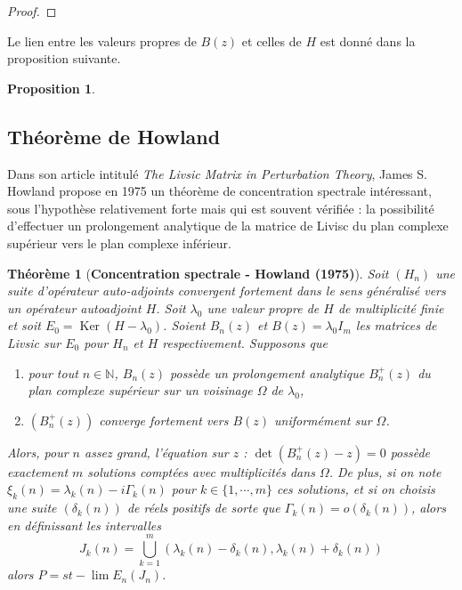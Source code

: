 \documentclass[12pt,openany,a4paper, titlepage]{article}
\newcommand{\lp}{\left(}
\newcommand{\rp}{\right)}
\newcommand{\N}{\mathbb{N}}
\newcommand{\Ker}{\operatorname{Ker}}
\newtheorem{prop}{Proposition}
\newtheorem{theo}{Théorème}
\theoremstyle{definition}
\theoremstyle{definition}
\theoremstyle{definition}
\theoremstyle{definition}
\theoremstyle{definition}
\theoremstyle{definition}
\begin{document}
\begin{proof}
    
\end{proof}

Le lien entre les valeurs propres de $B(z)$ et celles de $H$ est donné dans la proposition suivante.

\begin{prop}
    
\end{prop}

\subsection{Théorème de Howland}

Dans son article intitulé \textit{The Livsic  Matrix in Perturbation Theory}, James S. Howland propose en 1975 un théorème de concentration spectrale intéressant, sous l'hypothèse relativement forte mais qui est souvent vérifiée : la possibilité d'effectuer un prolongement analytique de la matrice de Livisc du plan complexe supérieur vers le plan complexe inférieur.

\begin{theo}[\textbf{Concentration spectrale - Howland (1975)}]
Soit $(H_n)$ une suite d'opérateur auto-adjoints convergent fortement dans le sens généralisé vers un opérateur autoadjoint $H$. Soit $\lambda_0$ une valeur propre de $H$ de multiplicité finie et soit $E_0 = \Ker(H -\lambda_0)$. Soient $B_n(z)$  et $B(z) = \lambda_0 I_m$ les matrices de Livsic sur $E_0$ pour $H_n$ et $H$ respectivement. 
Supposons que \begin{enumerate}
    \item[(1)] pour tout $n\in\N$, $B_n(z)$ possède un prolongement analytique $B_n^+(z)$ du plan complexe supérieur sur un voisinage $ \Omega$ de $\lambda_0$,
    \item[(2)] $\lp B_n^+(z)\rp$ converge fortement vers $B(z)$ uniformément sur $\Omega$.
\end{enumerate}
Alors, pour $n$ assez grand, l'équation sur $z$ : $\det(B_n^+(z) -z) = 0 $ possède exactement $m$ solutions comptées avec multiplicités dans $\Omega$. De plus, si on note $\xi_k(n) = \lambda_k(n) - i \Gamma_k(n)$ pour $k\in\{1,\cdots,m\}$ ces solutions, et si on choisis une suite $(\delta_k(n))$ de réels positifs de sorte que $\Gamma_k(n) = o(\delta_k(n))$, alors en définissant les intervalles 
$$ J_k(n) = \bigcup_{k=1}^m (\lambda_k(n) - \delta_k(n),\lambda_k(n) + \delta_k(n))$$ alors $P = st-\lim E_n(J_n)$.
\end{theo}
\end{document}
